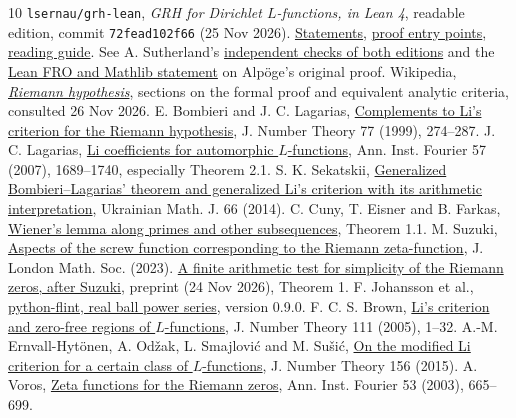 \documentclass[11pt,letterpaper]{article}
\newcommand{\code}[1]{\texttt{#1}}
\begin{document}
\begingroup\small
\begin{thebibliography}{10}\setlength{\itemsep}{2pt}\setlength{\parskip}{0pt}
 \code{lsernau/grh-lean}, \emph{GRH for Dirichlet $L$-functions, in Lean 4},
readable edition, commit \code{72fead102f66} (25 Nov 2026).
\href{https://github.com/lsernau/grh-lean/blob/72fead102f663d5c7a407964a13dc0cf9d977207/grh/src/Statements.lean}{Statements},
\href{https://github.com/lsernau/grh-lean/blob/72fead102f663d5c7a407964a13dc0cf9d977207/grh/src/Main.lean}{proof entry points},
\href{https://github.com/lsernau/grh-lean/blob/72fead102f663d5c7a407964a13dc0cf9d977207/grh/GUIDE.md}{reading guide}.
See A. Sutherland's \href{https://math.mit.edu/~drew/shortgrh/}{independent checks of both editions} and the \href{https://leanprover-community.github.io/blog/posts/riemann-hypothesis/}{Lean FRO and Mathlib statement} on Alp\"oge's original proof.
 Wikipedia, \href{https://en.wikipedia.org/wiki/Riemann_hypothesis}{\emph{Riemann hypothesis}}, sections on the formal proof and equivalent analytic criteria, consulted 26 Nov 2026.
 E. Bombieri and J. C. Lagarias, \href{https://doi.org/10.1006/jnth.1999.2392}{Complements to Li's criterion for the Riemann hypothesis}, J. Number Theory 77 (1999), 274--287.
 J. C. Lagarias, \href{https://doi.org/10.5802/aif.2311}{Li coefficients for automorphic $L$-functions}, Ann. Inst. Fourier 57 (2007), 1689--1740, especially Theorem 2.1.
 S. K. Sekatskii, \href{https://umj.imath.kiev.ua/index.php/umj/article/view/2139}{Generalized Bombieri--Lagarias' theorem and generalized Li's criterion with its arithmetic interpretation}, Ukrainian Math. J. 66 (2014).
 C. Cuny, T. Eisner and B. Farkas, \href{https://imacm.uni-wuppertal.de/fileadmin/imacm/preprints/2018/imacm_18_22.pdf}{Wiener's lemma along primes and other subsequences}, Theorem 1.1.
 M. Suzuki, \href{https://doi.org/10.1112/jlms.12785}{Aspects of the screw function corresponding to the Riemann zeta-function}, J. London Math. Soc. (2023).
 \href{https://hexagonmath.org/pdf/2611.00996v1}{A finite arithmetic test for simplicity of the Riemann zeros, after Suzuki}, preprint (24 Nov 2026), Theorem 1.
 F. Johansson et al., \href{https://python-flint.readthedocs.io/en/latest/arb_series.html}{python-flint, real ball power series}, version 0.9.0.
 F. C. S. Brown, \href{https://doi.org/10.1016/j.jnt.2004.07.016}{Li's criterion and zero-free regions of $L$-functions}, J. Number Theory 111 (2005), 1--32.
 A.-M. Ernvall-Hyt\"onen, A. Od\v{z}ak, L. Smajlovi\'c and M. Su\v{s}i\'c, \href{https://arxiv.org/abs/1410.4384}{On the modified Li criterion for a certain class of $L$-functions}, J. Number Theory 156 (2015).
 A. Voros, \href{https://doi.org/10.5802/aif.1955}{Zeta functions for the Riemann zeros}, Ann. Inst. Fourier 53 (2003), 665--699.
\end{thebibliography}
\endgroup
\end{document}
